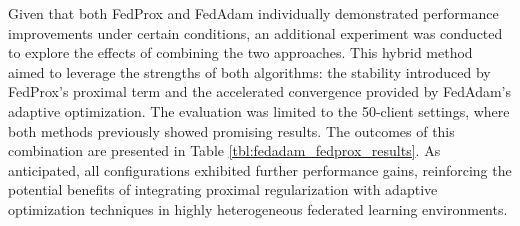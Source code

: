 Given that both FedProx and FedAdam individually demonstrated performance improvements under certain conditions, an additional experiment was conducted to explore the effects of combining the two approaches. This hybrid method aimed to leverage the strengths of both algorithms: the stability introduced by FedProx's proximal term and the accelerated convergence provided by FedAdam's adaptive optimization. The evaluation was limited to the 50-client settings, where both methods previously showed promising results. The outcomes of this combination are presented in Table \ref{tbl:fedadam_fedprox_results}. As anticipated, all configurations exhibited further performance gains, reinforcing the potential benefits of integrating proximal regularization with adaptive optimization techniques in highly heterogeneous federated learning environments.
